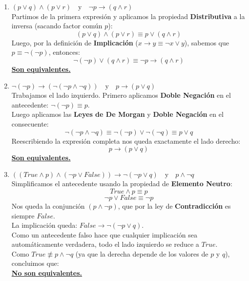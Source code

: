 \begin{enumerate}[label=\textbf{\alph*)}]
    
    \item \textbf{$(p \vee q) \wedge (p \vee r) \quad \text{y} \quad \neg p \rightarrow (q \wedge r)$} \\
    Partimos de la primera expresión y aplicamos la propiedad \textbf{Distributiva} a la inversa (sacando factor común $p$):
    \[ (p \vee q) \wedge (p \vee r) \equiv p \vee (q \wedge r) \]
    Luego, por la definición de \textbf{Implicación} ($x \rightarrow y \equiv \neg x \vee y$), sabemos que $p \equiv \neg(\neg p)$, entonces:
    \[ \neg(\neg p) \vee (q \wedge r) \equiv \neg p \rightarrow (q \wedge r) \]
    \underline{\textbf{Son equivalentes.}}

    \vspace{0.3cm}
    \item \textbf{$\neg(\neg p) \rightarrow (\neg(\neg p \wedge \neg q)) \quad \text{y} \quad p \rightarrow (p \vee q)$} \\
    Trabajamos el lado izquierdo. Primero aplicamos \textbf{Doble Negación} en el antecedente: $\neg(\neg p) \equiv p$. \\
    Luego aplicamos las \textbf{Leyes de De Morgan} y \textbf{Doble Negación} en el consecuente: 
    \[ \neg(\neg p \wedge \neg q) \equiv \neg(\neg p) \vee \neg(\neg q) \equiv p \vee q \]
    Reescribiendo la expresión completa nos queda exactamente el lado derecho:
    \[ p \rightarrow (p \vee q) \]
    \underline{\textbf{Son equivalentes.}}

    \vspace{0.3cm}
    \item \textbf{$((True \wedge p) \wedge (\neg p \vee False)) \rightarrow \neg(\neg p \vee q) \quad \text{y} \quad p \wedge \neg q$} \\
    Simplificamos el antecedente usando la propiedad de \textbf{Elemento Neutro}:
    \[ True \wedge p \equiv p \]
    \[ \neg p \vee False \equiv \neg p \]
    Nos queda la conjunción $(p \wedge \neg p)$, que por la ley de \textbf{Contradicción} es siempre $False$. \\
    La implicación queda: $False \rightarrow \neg(\neg p \vee q)$. \\
    Como un antecedente falso hace que cualquier implicación sea automáticamente verdadera, todo el lado izquierdo se reduce a $True$. \\
    Como $True \not\equiv p \wedge \neg q$ (ya que la derecha depende de los valores de $p$ y $q$), concluimos que: \\
    \underline{\textbf{No son equivalentes.}}


\end{enumerate}
